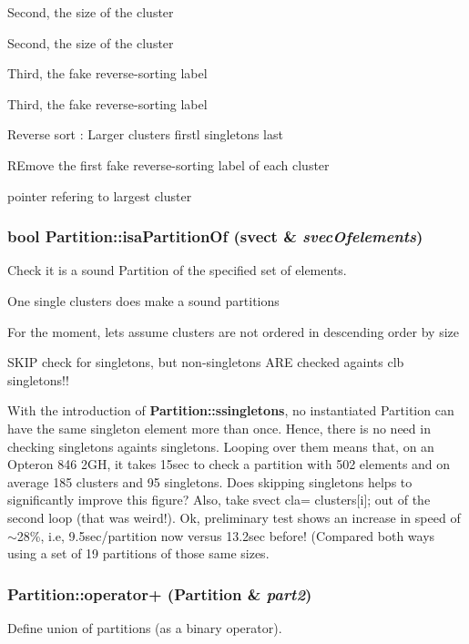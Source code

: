 Second, the size of the cluster

Second, the size of the cluster

Third, the fake reverse-sorting label

Third, the fake reverse-sorting label

Reverse sort : Larger clusters firstl singletons last

REmove the first fake reverse-sorting label of each cluster

pointer refering to largest cluster 
\subsubsection{\setlength{\rightskip}{0pt plus 5cm}bool Partition::isa\-Partition\-Of (svect \& {\em svec\-Ofelements})}\label{classPartition_a11}


Check it is a sound Partition of the specified set of elements. 

One single clusters does make a sound partitions

For the moment, lets assume clusters are not ordered in descending order by size

SKIP check for singletons, but non-singletons ARE checked againts clb singletons!!

With the introduction of {\bf Partition::ssingletons}, no instantiated Partition can have the same singleton element more than once. Hence, there is no need in checking singletons againts singletons. Looping over them means that, on an Opteron 846 2GH, it takes 15sec to check a partition with 502 elements and on average 185 clusters and 95 singletons. Does skipping singletons helps to significantly improve this figure? Also, take svect cla= clusters[i]; out of the second loop (that was weird!). Ok, preliminary test shows an increase in speed of $\sim$28\%, i.e, 9.5sec/partition now versus 13.2sec before! (Compared both ways using a set of 19 partitions of those same sizes. 
\subsubsection{ Partition::operator+ ({\bf Partition} \& {\em part2})}\label{classPartition_a72}


Define union of partitions (as a binary operator). 

